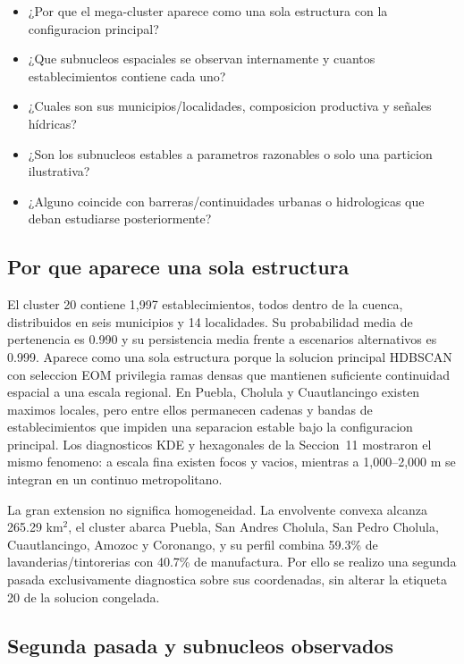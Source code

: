 \documentclass[11pt,letterpaper]{article}
\begin{document}
\begin{preguntas}
\begin{itemize}
    \item ¿Por que el mega-cluster aparece como una sola estructura con la configuracion principal?
    \item ¿Que subnucleos espaciales se observan internamente y cuantos establecimientos contiene cada uno?
    \item ¿Cuales son sus municipios/localidades, composicion productiva y señales hídricas?
    \item ¿Son los subnucleos estables a parametros razonables o solo una particion ilustrativa?
    \item ¿Alguno coincide con barreras/continuidades urbanas o hidrologicas que deban estudiarse posteriormente?
\end{itemize}
\end{preguntas}

\subsection{Por que aparece una sola estructura}

El cluster 20 contiene 1,997 establecimientos, todos dentro de la cuenca, distribuidos en seis municipios y 14 localidades. Su probabilidad media de pertenencia es 0.990 y su persistencia media frente a escenarios alternativos es 0.999. Aparece como una sola estructura porque la solucion principal HDBSCAN con seleccion EOM privilegia ramas densas que mantienen suficiente continuidad espacial a una escala regional. En Puebla, Cholula y Cuautlancingo existen maximos locales, pero entre ellos permanecen cadenas y bandas de establecimientos que impiden una separacion estable bajo la configuracion principal. Los diagnosticos KDE y hexagonales de la Seccion~11 mostraron el mismo fenomeno: a escala fina existen focos y vacios, mientras a 1,000--2,000 m se integran en un continuo metropolitano.

La gran extension no significa homogeneidad. La envolvente convexa alcanza 265.29 km$^2$, el cluster abarca Puebla, San Andres Cholula, San Pedro Cholula, Cuautlancingo, Amozoc y Coronango, y su perfil combina 59.3\% de lavanderias/tintorerias con 40.7\% de manufactura. Por ello se realizo una segunda pasada exclusivamente diagnostica sobre sus coordenadas, sin alterar la etiqueta 20 de la solucion congelada.

\subsection{Segunda pasada y subnucleos observados}
\end{document}
